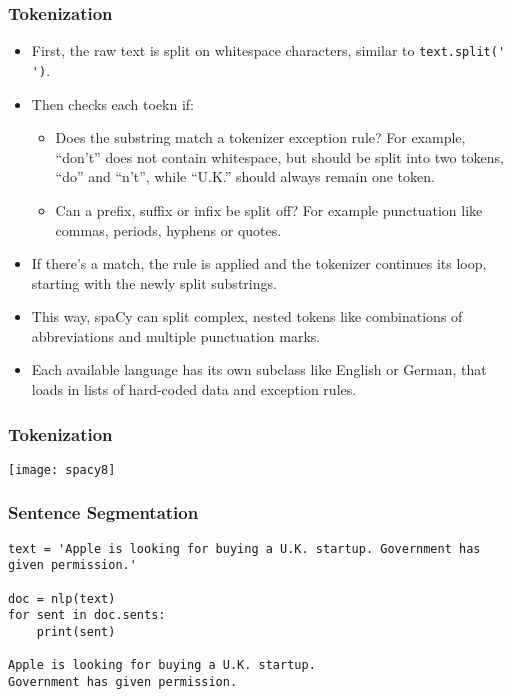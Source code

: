 \begin{frame}[fragile]\frametitle{Tokenization}

\begin{itemize}
\item First, the raw text is split on whitespace characters, similar to \lstinline|text.split(' ')|.
\item Then checks each toekn if:
\begin{itemize}
\item Does the substring match a tokenizer exception rule? For example, “don't” does not contain whitespace, but should be split into two tokens, “do” and “n't”, while “U.K.” should always remain one token.
\item Can a prefix, suffix or infix be split off? For example punctuation like commas, periods, hyphens or quotes.
\end{itemize}

\item If there's a match, the rule is applied and the tokenizer continues its loop, starting with the newly split substrings. 
\item This way, spaCy can split complex, nested tokens like combinations of abbreviations and multiple punctuation marks.
\item Each available language has its own subclass like English or German, that loads in lists of hard-coded data and exception rules.
\end{itemize}
\end{frame}

\begin{frame}[fragile]\frametitle{Tokenization}

\begin{center}
\texttt{[image: spacy8]}
\end{center}

\end{frame}


\begin{frame}[fragile]\frametitle{Sentence Segmentation}

\begin{lstlisting}
text = 'Apple is looking for buying a U.K. startup. Government has given permission.'

doc = nlp(text)
for sent in doc.sents:
    print(sent)
		
Apple is looking for buying a U.K. startup.
Government has given permission.
\end{lstlisting}
	
\end{frame}


